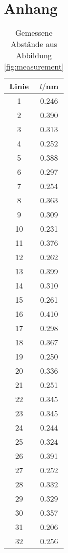 \section{Anhang}    

\begin{table}[h]
  \centering
  \begin{tabular}{cc}
    \toprule
    Linie & $l/$nm\\
    \midrule
    1	&0.246\\
    2	&0.390\\
    3	&0.313\\
    4	&0.252\\
    5	&0.388\\
    6   &0.297\\
    7	&0.254\\
    8	&0.363\\
    9	&0.309\\
    10	&0.231\\
    11	&0.376\\
    12	&0.262\\
    13	&0.399\\
    14	&0.310\\
    15	&0.261\\
    16	&0.410\\
    17	&0.298\\
    18	&0.367\\
    19	&0.250\\
    20	&0.336\\
    21	&0.251\\
    22	&0.345\\
    23	&0.345\\
    24	&0.244\\
    25	&0.324\\
    26	&0.391\\
    27	&0.252\\
    28	&0.332\\
    29	&0.329\\
    30	&0.357\\
    31	&0.206\\
    32	&0.256\\
    \bottomrule
  \end{tabular}
  \caption{Gemessene Abstände aus Abbildung \ref{fig:measurement}}
  \label{tab:measurement}
\end{table}
